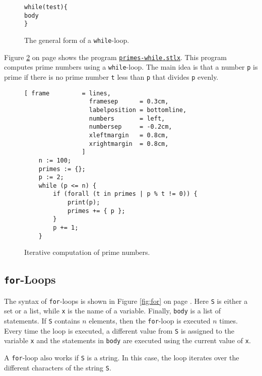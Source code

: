 \begin{figure}[!ht]
  \centering
\begin{alltt}
      while (test) \{
          body
      \}
\end{alltt}
\vspace*{-0.3cm}
\caption{The general form of a \texttt{while}-loop.  \label{fig:while}}
\end{figure} 

Figure \ref{fig:primes-while.stlx} on page \pageref{fig:primes-while.stlx} shows the program
\href{https://github.com/karlstroetmann/Logik/blob/master/SetlX/primes-while.stlx}{\texttt{primes-while.stlx}}.
This program computes prime numbers using a  \texttt{while}-loop.  The main idea is that a number \texttt{p} is
prime if there is no prime number \texttt{t} less than \texttt{p} that divides \texttt{p} evenly.


\begin{figure}[!ht]
  \centering
\begin{Verbatim}[ frame         = lines, 
                  framesep      = 0.3cm, 
                  labelposition = bottomline,
                  numbers       = left,
                  numbersep     = -0.2cm,
                  xleftmargin   = 0.8cm,
                  xrightmargin  = 0.8cm,
                ]
    n := 100;
    primes := {};
    p := 2;
    while (p <= n) {
        if (forall (t in primes | p % t != 0)) {
            print(p);
            primes += { p };
        }
        p += 1;
    }
\end{Verbatim} 
\vspace*{-0.3cm}
\caption{Iterative computation of prime numbers.}  \label{fig:primes-while.stlx}
\end{figure} %


\subsection{\texttt{for}-Loops}
The syntax of  \texttt{for}-loops is shown in Figure \ref{fig:for} on page \pageref{fig:for}.  
Here \texttt{S} is either a set or a list, while \texttt{x} is the name of a variable.  Finally, \texttt{body}
is a list of statements.
If \texttt{S} contains $n$ elements, then the \texttt{for}-loop is executed $n$ times.  Every time the loop is
executed, a different value from \texttt{S} is assigned to the variable \texttt{x} and the statements in
\texttt{body} are executed using the current value of \texttt{x}.

A \texttt{for}-loop also works if \texttt{S} is a string.  In this case, the loop iterates over the different characters
of the string \texttt{S}.

